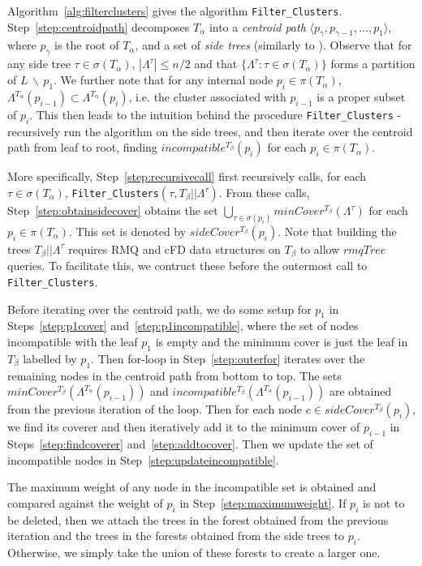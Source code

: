 \documentclass[12pt,a4paper]{article}
\newcommand{\leafset}{\Lambda}
\newcommand{\TA}{T_\alpha}
\newcommand{\TB}{T_\beta}
\begin{document}
    Algorithm~\ref{alg:filterclusters} gives the algorithm \texttt{Filter\_Clusters}. Step~\ref{step:centroidpath} decomposes $\TA$ into a \textit{centroid path} $\langle p_{\gamma}, p_{\gamma - 1}, \dots, p_1 \rangle$, where $p_{\gamma}$ is the root of $\TA$, and a set of \textit{side trees} (similarly to \cite{jansson2018algorithms}). Observe that for any side tree $\tau \in \sigma(\TA)$, $|\leafset^\tau| \leq n/2$ and that $\{\leafset^{\tau} : \tau \in \sigma(\TA)\}$ forms a partition of $L\, \backslash\, {p_1}$. We further note that for any internal node $p_i \in \pi(\TA)$, $\leafset^{\TA}(p_{i - 1}) \subset \leafset^{\TA}(p_i)$, i.e. the cluster associated with $p_{i-1}$ is a proper subset of $p_i$. This then leads to the intuition behind the procedure \texttt{Filter\_Clusters} - recursively run the algorithm on the side trees, and then iterate over the centroid path from leaf to root, finding $incompatible^{\TB}(p_i)$ for each $p_i \in \pi(\TA)$.

    More specifically, Step~\ref{step:recursivecall} first recursively calls, for each $\tau \in \sigma(\TA)$, \texttt{Filter\_Clusters}$(\tau, \TB||\leafset^{\tau})$. From these calls, Step~\ref{step:obtainsidecover} obtains the set $\bigcup_{\tau \in \sigma(p_i)} minCover^{\TB}(\leafset^{\tau})$ for each $p_i \in \pi(\TA)$. This set is denoted by $sideCover^{\TB}(p_i)$. Note that building the trees $\TB||\leafset^{\tau}$ requires RMQ and cFD data structures on $\TB$ to allow $rmqTree$ queries. To facilitate this, we contruct these before the outermost call to \texttt{Filter\_Clusters}.

    Before iterating over the centroid path, we do some setup for $p_1$ in Steps~\ref{step:p1cover} and~\ref{step:p1incompatible}, where the set of nodes incompatible with the leaf $p_1$ is empty and the minimum cover is just the leaf in $\TB$ labelled by $p_1$. Then for-loop in Step~\ref{step:outerfor} iterates over the remaining nodes in the centroid path from bottom to top. The sets $minCover^{\TB}(\leafset^{\TA}(p_{i-1}))$ and $incompatible^{\TB}(\leafset^{\TA}(p_{i-1}))$ are obtained from the previous iteration of the loop. Then for each node $c \in sideCover^{\TB}(p_i)$, we find its coverer and then iteratively add it to the minimum cover of $p_{i-1}$ in Steps~\ref{step:findcoverer} and~\ref{step:addtocover}. Then we update the set of incompatible nodes in Step~\ref{step:updateincompatible}.

    The maximum weight of any node in the incompatible set is obtained and compared against the weight of $p_i$ in Step~\ref{step:maximumweight}. If $p_i$ is not to be deleted, then we attach the trees in the forest obtained from the previous iteration and the trees in the forests obtained from the side trees to $p_i$. Otherwise, we simply take the union of these forests to create a larger one.
\end{document}
